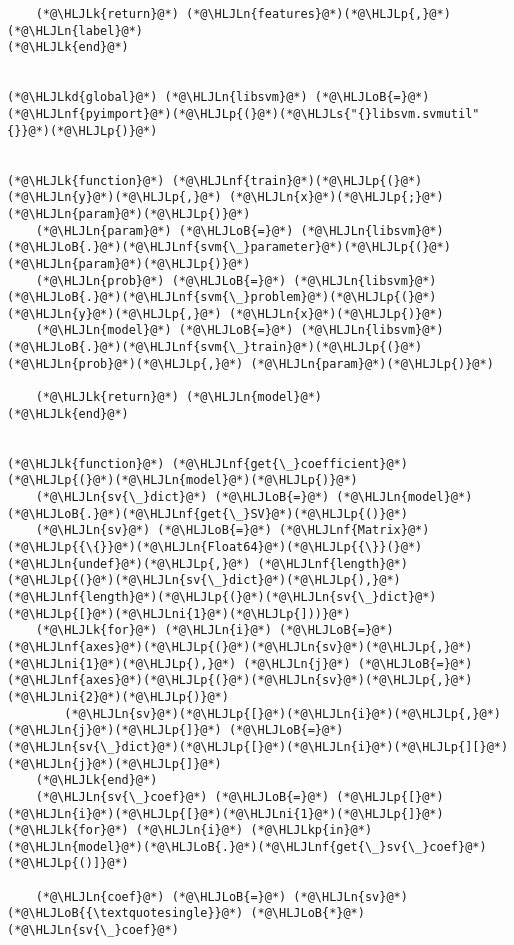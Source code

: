 \documentclass[12pt,a4paper]{article}
\newcommand{\HLJLk}[1]{\textcolor[RGB]{148,91,176}{\textbf{#1}}}
\newcommand{\HLJLkd}[1]{\textcolor[RGB]{214,102,97}{\textit{#1}}}
\newcommand{\HLJLkp}[1]{\textcolor[RGB]{148,91,176}{\textbf{#1}}}
\newcommand{\HLJLn}[1]{#1}
\newcommand{\HLJLnf}[1]{\textcolor[RGB]{66,102,213}{#1}}
\newcommand{\HLJLs}[1]{\textcolor[RGB]{201,61,57}{#1}}
\newcommand{\HLJLni}[1]{\textcolor[RGB]{59,151,46}{#1}}
\newcommand{\HLJLoB}[1]{\textcolor[RGB]{102,102,102}{\textbf{#1}}}
\newcommand{\HLJLp}[1]{#1}
\begin{document}
\begin{lstlisting}
    (*@\HLJLk{return}@*) (*@\HLJLn{features}@*)(*@\HLJLp{,}@*) (*@\HLJLn{label}@*)
(*@\HLJLk{end}@*)


(*@\HLJLkd{global}@*) (*@\HLJLn{libsvm}@*) (*@\HLJLoB{=}@*) (*@\HLJLnf{pyimport}@*)(*@\HLJLp{(}@*)(*@\HLJLs{"{}libsvm.svmutil"{}}@*)(*@\HLJLp{)}@*)


(*@\HLJLk{function}@*) (*@\HLJLnf{train}@*)(*@\HLJLp{(}@*)(*@\HLJLn{y}@*)(*@\HLJLp{,}@*) (*@\HLJLn{x}@*)(*@\HLJLp{;}@*) (*@\HLJLn{param}@*)(*@\HLJLp{)}@*)
    (*@\HLJLn{param}@*) (*@\HLJLoB{=}@*) (*@\HLJLn{libsvm}@*)(*@\HLJLoB{.}@*)(*@\HLJLnf{svm{\_}parameter}@*)(*@\HLJLp{(}@*)(*@\HLJLn{param}@*)(*@\HLJLp{)}@*)
    (*@\HLJLn{prob}@*) (*@\HLJLoB{=}@*) (*@\HLJLn{libsvm}@*)(*@\HLJLoB{.}@*)(*@\HLJLnf{svm{\_}problem}@*)(*@\HLJLp{(}@*)(*@\HLJLn{y}@*)(*@\HLJLp{,}@*) (*@\HLJLn{x}@*)(*@\HLJLp{)}@*)
    (*@\HLJLn{model}@*) (*@\HLJLoB{=}@*) (*@\HLJLn{libsvm}@*)(*@\HLJLoB{.}@*)(*@\HLJLnf{svm{\_}train}@*)(*@\HLJLp{(}@*)(*@\HLJLn{prob}@*)(*@\HLJLp{,}@*) (*@\HLJLn{param}@*)(*@\HLJLp{)}@*)

    (*@\HLJLk{return}@*) (*@\HLJLn{model}@*)
(*@\HLJLk{end}@*)


(*@\HLJLk{function}@*) (*@\HLJLnf{get{\_}coefficient}@*)(*@\HLJLp{(}@*)(*@\HLJLn{model}@*)(*@\HLJLp{)}@*)
    (*@\HLJLn{sv{\_}dict}@*) (*@\HLJLoB{=}@*) (*@\HLJLn{model}@*)(*@\HLJLoB{.}@*)(*@\HLJLnf{get{\_}SV}@*)(*@\HLJLp{()}@*)
    (*@\HLJLn{sv}@*) (*@\HLJLoB{=}@*) (*@\HLJLnf{Matrix}@*)(*@\HLJLp{{\{}}@*)(*@\HLJLn{Float64}@*)(*@\HLJLp{{\}}(}@*)(*@\HLJLn{undef}@*)(*@\HLJLp{,}@*) (*@\HLJLnf{length}@*)(*@\HLJLp{(}@*)(*@\HLJLn{sv{\_}dict}@*)(*@\HLJLp{),}@*) (*@\HLJLnf{length}@*)(*@\HLJLp{(}@*)(*@\HLJLn{sv{\_}dict}@*)(*@\HLJLp{[}@*)(*@\HLJLni{1}@*)(*@\HLJLp{]))}@*)
    (*@\HLJLk{for}@*) (*@\HLJLn{i}@*) (*@\HLJLoB{=}@*) (*@\HLJLnf{axes}@*)(*@\HLJLp{(}@*)(*@\HLJLn{sv}@*)(*@\HLJLp{,}@*) (*@\HLJLni{1}@*)(*@\HLJLp{),}@*) (*@\HLJLn{j}@*) (*@\HLJLoB{=}@*) (*@\HLJLnf{axes}@*)(*@\HLJLp{(}@*)(*@\HLJLn{sv}@*)(*@\HLJLp{,}@*) (*@\HLJLni{2}@*)(*@\HLJLp{)}@*)
        (*@\HLJLn{sv}@*)(*@\HLJLp{[}@*)(*@\HLJLn{i}@*)(*@\HLJLp{,}@*) (*@\HLJLn{j}@*)(*@\HLJLp{]}@*) (*@\HLJLoB{=}@*) (*@\HLJLn{sv{\_}dict}@*)(*@\HLJLp{[}@*)(*@\HLJLn{i}@*)(*@\HLJLp{][}@*)(*@\HLJLn{j}@*)(*@\HLJLp{]}@*)
    (*@\HLJLk{end}@*)
    (*@\HLJLn{sv{\_}coef}@*) (*@\HLJLoB{=}@*) (*@\HLJLp{[}@*)(*@\HLJLn{i}@*)(*@\HLJLp{[}@*)(*@\HLJLni{1}@*)(*@\HLJLp{]}@*) (*@\HLJLk{for}@*) (*@\HLJLn{i}@*) (*@\HLJLkp{in}@*) (*@\HLJLn{model}@*)(*@\HLJLoB{.}@*)(*@\HLJLnf{get{\_}sv{\_}coef}@*)(*@\HLJLp{()]}@*)

    (*@\HLJLn{coef}@*) (*@\HLJLoB{=}@*) (*@\HLJLn{sv}@*)(*@\HLJLoB{{\textquotesingle}}@*) (*@\HLJLoB{*}@*) (*@\HLJLn{sv{\_}coef}@*)


\end{lstlisting}
\end{document}
